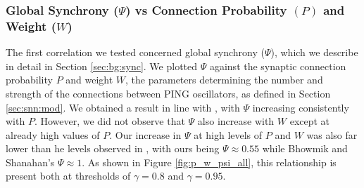 \documentclass[a4paper,11pt]{article}
\begin{document}
\subsubsection{Global Synchrony ($\Psi$) vs Connection Probability $(P)$ and Weight ($W$)}
\label{sec:app:snn:res:sync}
The first correlation we tested concerned global synchrony ($\Psi$), which we describe in detail in Section \ref{sec:bg:sync}. We plotted $\Psi$ against the synaptic connection probability $P$ and weight $W$, the parameters determining the number and strength of the connections between PING oscillators, as defined in Section \ref{sec:snn:mod}. We obtained a result in line with \cite{Bhowmik2013}, with $\Psi$ increasing consistently with $P$. However, we did not observe that $\Psi$ also increase with $W$ except at already high values of $P$. Our increase in $\Psi$ at high levels of $P$ and $W$ was also far lower than he levels observed in \cite{Bhowmik2013}, with ours being $\Psi \approx 0.55$ while Bhowmik and Shanahan's $\Psi \approx 1$. As shown in Figure \ref{fig:p_w_psi_all}, this relationship is present both at thresholds of $\gamma = 0.8$ and $\gamma = 0.95$.
\end{document}
